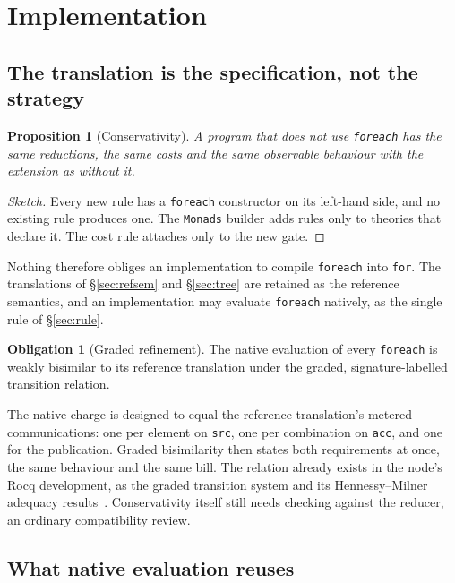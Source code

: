 \documentclass[11pt]{article}
\theoremstyle{definition}
\newtheorem{obligation}[definition]{Obligation}
\theoremstyle{plain}
\newtheorem{proposition}[definition]{Proposition}
\theoremstyle{remark}
\newcommand{\fe}{\texttt{foreach}}
\begin{document}
\section{Implementation}
\label{sec:impl}

\subsection{The translation is the specification, not the strategy}

\begin{proposition}[Conservativity]
\label{prop:conservative}
A program that does not use \fe{} has the same reductions, the same costs and
the same observable behaviour with the extension as without it.
\end{proposition}

\begin{proof}[Sketch]
Every new rule has a \fe{} constructor on its left-hand side, and no existing
rule produces one. The \texttt{Monads} builder adds rules only to theories that
declare it. The cost rule attaches only to the new gate.
\end{proof}

Nothing therefore obliges an implementation to compile \fe{} into
\texttt{for}. The translations of \S\ref{sec:refsem} and \S\ref{sec:tree} are
retained as the reference semantics, and an implementation may evaluate \fe{}
natively, as the single rule of \S\ref{sec:rule}.

\begin{obligation}[Graded refinement]
\label{obl:graded}
The native evaluation of every \fe{} is weakly bisimilar to its reference
translation under the graded, signature-labelled transition relation.
\end{obligation}

The native charge is designed to equal the reference translation's metered
communications: one per element on \texttt{src}, one per combination on
\texttt{acc}, and one for the publication. Graded bisimilarity then states both
requirements at once, the same behaviour and the same bill. The relation
already exists in the node's Rocq development, as the graded transition system
and its Hennessy--Milner adequacy results~\cite{f1r3nodeOTE}. Conservativity
itself still needs checking against the reducer, an ordinary compatibility
review.

\subsection{What native evaluation reuses}
\end{document}
